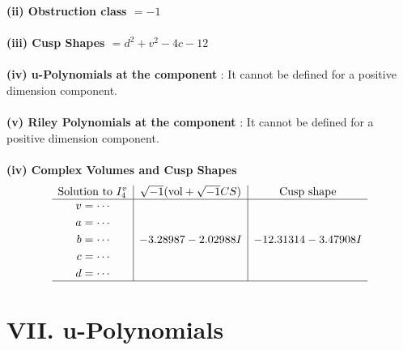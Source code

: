 \documentclass[1p]{elsarticle_modified}
\theoremstyle{definition}
\newcommand{\I}{\sqrt{-1}}
\begin{document}
\flushleft \textbf{(ii) Obstruction class $= -1$}\\~\\
\flushleft \textbf{(iii) Cusp Shapes $= d^2+v^2-4 c-12$}\\~\\
\flushleft \textbf{(iv) u-Polynomials at the component} : It cannot be defined for a positive dimension component.\\~\\
\flushleft \textbf{(v) Riley Polynomials at the component} : It cannot be defined for a positive dimension component.\\~\\
\newpage\flushleft \textbf{(iv) Complex Volumes and Cusp Shapes}
$$\begin{array}{c|c|c} 
\text{Solution to }I^v_{4}& \I (\text{vol} + \sqrt{-1}CS) & \text{Cusp shape}\\
 \hline 
\begin{aligned}
v &= \cdots \\
a &= \cdots \\
b &= \cdots \\
c &= \cdots \\
d &= \cdots\end{aligned}
 & -3.28987 - 2.02988 I & -12.31314 - 3.47908 I\\
 \hline 
 \end{array}
$$
\newpage\renewcommand{\arraystretch}{1}
\centering \section*{ VII. u-Polynomials}
\end{document}
